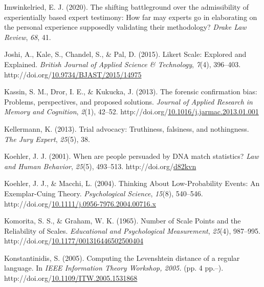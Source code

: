 \documentclass[print]{nuthesis}
\newlength{\cslhangindent}
\newenvironment{CSLReferences}[2]%
{\setlength{\parindent}{0pt}%
\everypar{\setlength{\hangindent}{\cslhangindent}}\ignorespaces}%
{\par}
\begin{document}
\begin{CSLReferences}{1}{0}
\leavevmode{}%
Imwinkelried, E. J. (2020). The shifting battleground over the admissibility of experientially based expert testimony: How far may experts go in elaborating on the personal experience supposedly validating their methodology? \emph{Drake Law Review}, \emph{68}, 41.

\leavevmode{}%
Joshi, A., Kale, S., Chandel, S., \& Pal, D. (2015). Likert {Scale}: {Explored} and {Explained}. \emph{British Journal of Applied Science \& Technology}, \emph{7}(4), 396--403. http://doi.org/\href{https://doi.org/10.9734/BJAST/2015/14975}{10.9734/BJAST/2015/14975}

\leavevmode{}%
Kassin, S. M., Dror, I. E., \& Kukucka, J. (2013). The forensic confirmation bias: {Problems}, perspectives, and proposed solutions. \emph{Journal of Applied Research in Memory and Cognition}, \emph{2}(1), 42--52. http://doi.org/\href{https://doi.org/10.1016/j.jarmac.2013.01.001}{10.1016/j.jarmac.2013.01.001}

\leavevmode{}%
Kellermann, K. (2013). Trial advocacy: {Truthiness}, falsiness, and nothingness. \emph{The Jury Expert}, \emph{25}(5), 38.

\leavevmode{}%
Koehler, J. J. (2001). When are people persuaded by {DNA} match statistics? \emph{Law and Human Behavior}, \emph{25}(5), 493--513. http://doi.org/\href{https://doi.org/d82kvn}{d82kvn}

\leavevmode{}%
Koehler, J. J., \& Macchi, L. (2004). Thinking {About} {Low}-{Probability} {Events}: {An} {Exemplar}-{Cuing} {Theory}. \emph{Psychological Science}, \emph{15}(8), 540--546. http://doi.org/\href{https://doi.org/10.1111/j.0956-7976.2004.00716.x}{10.1111/j.0956-7976.2004.00716.x}

\leavevmode{}%
Komorita, S. S., \& Graham, W. K. (1965). Number of {Scale} {Points} and the {Reliability} of {Scales}. \emph{Educational and Psychological Measurement}, \emph{25}(4), 987--995. http://doi.org/\href{https://doi.org/10.1177/001316446502500404}{10.1177/001316446502500404}

\leavevmode{}%
Konstantinidis, S. (2005). Computing the {Levenshtein} distance of a regular language. In \emph{{IEEE} {Information} {Theory} {Workshop}, 2005.} (pp. 4 pp.--). http://doi.org/\href{https://doi.org/10.1109/ITW.2005.1531868}{10.1109/ITW.2005.1531868}


\end{CSLReferences}
\end{document}
